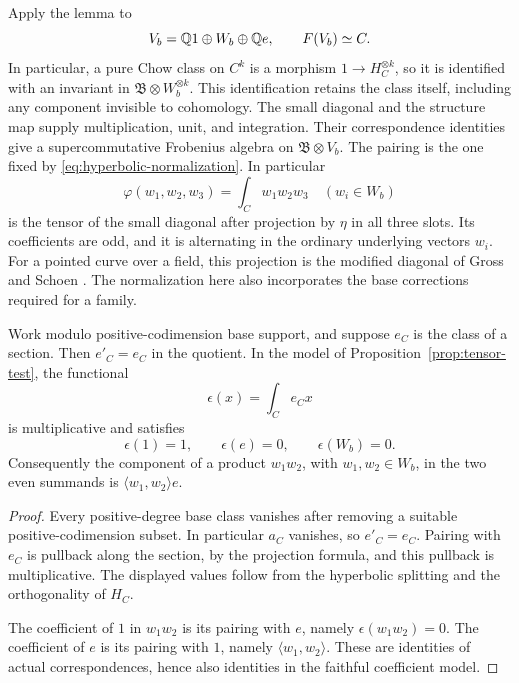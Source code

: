 Apply the lemma to
\[
 V_b=\mathbb Q1\oplus W_b\oplus\mathbb Q e,
 \qquad F(V_b)\simeq C.
\]
In particular, a pure Chow class on \(C^k\) is a morphism
\(1\to H_C^{\otimes k}\), so it is identified with an invariant in
\(\mathfrak B\otimes W_b^{\otimes k}\).  This identification retains
the class itself, including any component invisible to cohomology.
The small diagonal and the structure map supply multiplication,
unit, and integration.  Their correspondence identities give a
supercommutative Frobenius algebra on \(\mathfrak B\otimes V_b\).
The pairing is the one fixed by
\eqref{eq:hyperbolic-normalization}.  In particular
\begin{equation}
 \label{eq:actual-cubic-form}
 \varphi(w_1,w_2,w_3)=\int_C w_1w_2w_3
 \quad (w_i\in W_b)
\end{equation}
is the tensor of the small diagonal after projection by \(\eta\) in
all three slots.  Its coefficients are odd, and it is alternating
in the ordinary underlying vectors \(w_i\). For a pointed curve over a
field, this projection is the modified diagonal of Gross and Schoen
\cite[Equation~(0.1) and Sections~2--3]{GrossSchoen1995}. The normalization
here also incorporates the base corrections required for a family.

\begin{lemma}
 \label{lem:point-centered-algebra}
Work modulo positive-codimension base support, and suppose \(e_C\)
is the class of a section.  Then \(e'_C=e_C\) in the quotient.
In the model of Proposition~\ref{prop:tensor-test}, the functional
\[
 \epsilon(x)=\int_C e_Cx
\]
is multiplicative and satisfies
\[
 \epsilon(1)=1,\qquad
 \epsilon(e)=0,\qquad
 \epsilon(W_b)=0.
\]
Consequently the component of a product \(w_1w_2\), with
\(w_1,w_2\in W_b\), in the two even summands is
\(\langle w_1,w_2\rangle e\).
\end{lemma}

\begin{proof}
Every positive-degree base class vanishes after removing a suitable
positive-codimension subset.  In particular \(a_C\) vanishes, so
\(e'_C=e_C\).  Pairing with \(e_C\) is pullback along the section, by
the projection formula, and this pullback is multiplicative.
The displayed values follow from the hyperbolic splitting and the
orthogonality of \(H_C\).

The coefficient of \(1\) in \(w_1w_2\) is its pairing with \(e\),
namely \(\epsilon(w_1w_2)=0\).  The coefficient of \(e\) is its
pairing with \(1\), namely \(\langle w_1,w_2\rangle\).  These are
identities of actual correspondences, hence also identities in the
faithful coefficient model.
\end{proof}


